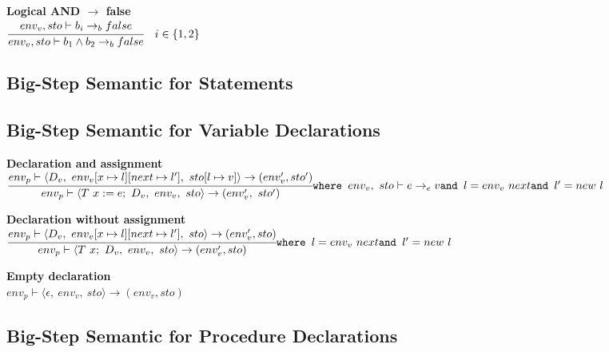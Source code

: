 \textbf{Logical AND $\rightarrow$ false}\\
\begin{math}
	\cfrac{env_v, sto \vdash b_i \rightarrow_b false}{env_v, sto \vdash b_1 \wedge b_2 \rightarrow_b false} \quad i \in \{1,2\}
\end{math}

\subsection{Big-Step Semantic for Statements}

\subsection{Big-Step Semantic for Variable Declarations}
\textbf{Declaration and assignment}\\
\begin{math}
	\cfrac{env_p \vdash \langle D_v, \ env_v[x \mapsto l][next \mapsto l'], \ sto[l \mapsto v] \rangle \rightarrow (env_v', sto')}{env_p \vdash \langle T \ x := e; \ D_v, \ env_v, \ sto \rangle \rightarrow (env_v', \ sto')}\\
	\texttt{where } env_v, \ sto \vdash e \rightarrow_e v\\
	\texttt{and } l = env_v \ next\\
	\texttt{and } l' = new \ l
\end{math}

\textbf{Declaration without assignment}\\
\begin{math}
	\cfrac{env_p \vdash \langle D_v, \ env_v[x \mapsto l][next \mapsto l'], \ sto \rangle \rightarrow (env_v', sto)}{env_p \vdash \langle T \ x; \ D_v, \ env_v, \ sto \rangle \rightarrow (env_v', sto)}\\
	\texttt{where } l = env_v \ next\\
	\texttt{and } l' = new \ l
\end{math}

\textbf{Empty declaration}\\
\begin{math}
	env_p \vdash \langle \epsilon, \ env_v, \ sto \rangle \rightarrow (env_v, sto)
\end{math}

\subsection{Big-Step Semantic for Procedure Declarations}

